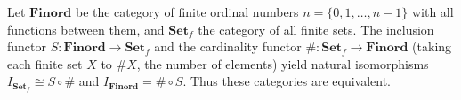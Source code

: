 Let $\mathbf{Finord}$ be the category of finite ordinal numbers $n = \{0,1,\ldots,n-1\}$ with all functions between them, and $\mathbf{Set}_f$ the category of all finite sets. The inclusion functor $S: \mathbf{Finord} \rightarrow \mathbf{Set}_f$ and the cardinality functor $\#: \mathbf{Set}_f \rightarrow \mathbf{Finord}$ (taking each finite set $X$ to $\#X$, the number of elements) yield natural isomorphisms $I_{\mathbf{Set}_f} \cong S \circ \#$ and $I_{\mathbf{Finord}} = \# \circ S$. Thus these categories are equivalent.